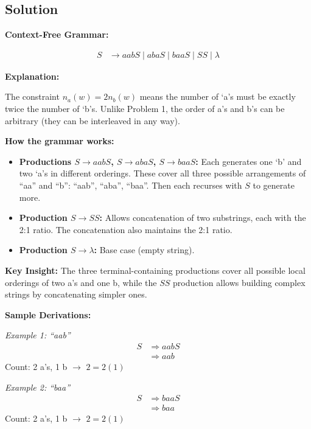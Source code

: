 \documentclass[12pt]{article}
\begin{document}
\subsection{Solution}

\textbf{Context-Free Grammar:}

\begin{align*}
S &\to aabS \mid abaS \mid baaS \mid SS \mid \lambda
\end{align*}

\textbf{Explanation:}

The constraint $n_a(w) = 2n_b(w)$ means the number of `a's must be exactly twice the number of `b's. Unlike Problem 1, the order of a's and b's can be arbitrary (they can be interleaved in any way).

\textbf{How the grammar works:}

\begin{itemize}
\item \textbf{Productions $S \to aabS$, $S \to abaS$, $S \to baaS$:} Each generates one `b' and two `a's in different orderings. These cover all three possible arrangements of ``aa'' and ``b'': ``aab'', ``aba'', ``baa''. Then each recurses with $S$ to generate more.

\item \textbf{Production $S \to SS$:} Allows concatenation of two substrings, each with the 2:1 ratio. The concatenation also maintains the 2:1 ratio.

\item \textbf{Production $S \to \lambda$:} Base case (empty string).
\end{itemize}

\textbf{Key Insight:} The three terminal-containing productions cover all possible local orderings of two a's and one b, while the $SS$ production allows building complex strings by concatenating simpler ones.

\textbf{Sample Derivations:}

\textit{Example 1: ``aab''}
\begin{align*}
S &\Rightarrow aabS \\
  &\Rightarrow aab
\end{align*}
Count: 2 a's, 1 b $\to$ $2 = 2(1)$ \checkmark

\textit{Example 2: ``baa''}
\begin{align*}
S &\Rightarrow baaS \\
  &\Rightarrow baa
\end{align*}
Count: 2 a's, 1 b $\to$ $2 = 2(1)$ \checkmark
\end{document}
